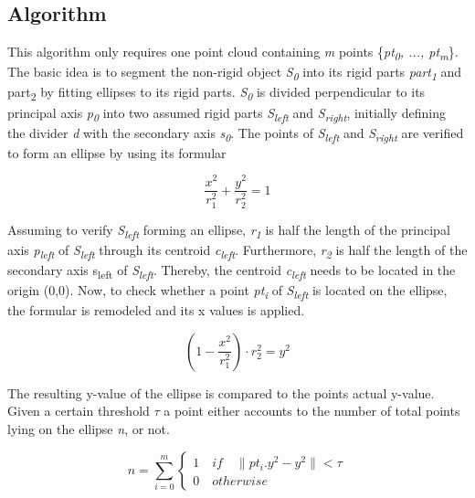 \subsection{Algorithm}

This algorithm only requires one point cloud containing \textit{m} points \{\textit{pt\textsubscript{0}, ..., pt\textsubscript{m}}\}. The basic idea is to segment the non-rigid object  \textit{S\textsubscript{0}} into its rigid parts \textit{part\textsubscript{1}} and {part\textsubscript{2}} by fitting ellipses to its rigid parts. 
\textit{S\textsubscript{0}} is divided perpendicular to its principal axis \textit{p\textsubscript{0}} into two assumed rigid parts \textit{S\textsubscript{left}} and \textit{S\textsubscript{right}}, initially defining the divider \textit{d} with the secondary axis \textit{s\textsubscript{0}}. The points of \textit{S\textsubscript{left}} and \textit{S\textsubscript{right}} are verified to 
form an ellipse by using its formular

\begin{equation}
\dfrac{x^2}{r_1^2} + \dfrac{y^2}{r_2^2} = 1
\end{equation}

Assuming to verify \textit{S\textsubscript{left}} forming an ellipse, \textit{r\textsubscript{1}} is half the length of the principal axis \textit{p\textsubscript{left}} of \textit{S\textsubscript{left}} through its centroid \textit{c\textsubscript{left}}. Furthermore, \textit{r\textsubscript{2}} is half the length of the secondary axis {s\textsubscript{left}} of \textit{S\textsubscript{left}}. Thereby, the centroid \textit{c\textsubscript{left}} needs to be located in the origin (0,0). 
Now, to check whether a point \textit{pt\textsubscript{i}} of \textit{S\textsubscript{left}} is located on the ellipse, the formular is remodeled and its x values is applied. 

\begin{equation}
(1 -  \dfrac{x^2}{r_1^2}) \cdot {r_2^2} = y^2
\end{equation}

The resulting y-value of the ellipse is compared to the points actual y-value. Given a certain threshold $\tau$ a point either accounts to the number of total points lying on the ellipse \textit{n}, or not.

\begin{equation}
n = \sum_{i=0}^{m}\begin{cases}1 \quad if \quad \|pt_i.y^2 - y^2 \| < \tau \\ 0 \quad otherwise\end{cases}
\end{equation}

